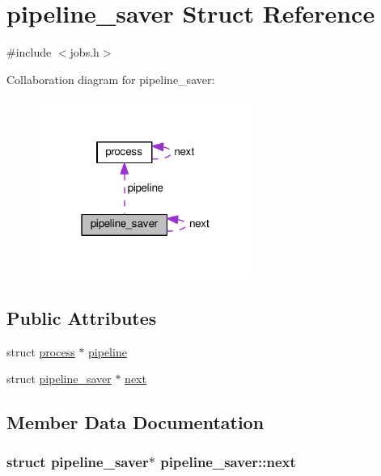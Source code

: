 \hypertarget{structpipeline__saver}{}\section{pipeline\+\_\+saver Struct Reference}
\label{structpipeline__saver}


{\ttfamily \#include $<$jobs.\+h$>$}



Collaboration diagram for pipeline\+\_\+saver\+:
\nopagebreak
\begin{figure}[H]
\begin{center}
\leavevmode
\includegraphics[width=199pt]{structpipeline__saver__coll__graph}
\end{center}
\end{figure}
\subsection*{Public Attributes}
\begin{DoxyCompactItemize}
\item 
struct \hyperlink{structprocess}{process} $\ast$ \hyperlink{structpipeline__saver_a150b4d503a5673894709f96b053de8b2}{pipeline}
\item 
struct \hyperlink{structpipeline__saver}{pipeline\+\_\+saver} $\ast$ \hyperlink{structpipeline__saver_a736199ba9d005768c1a764a5da6a69e6}{next}
\end{DoxyCompactItemize}


\subsection{Member Data Documentation}
\subsubsection[{\texorpdfstring{next}{next}}]{\setlength{\rightskip}{0pt plus 5cm}struct {\bf pipeline\+\_\+saver}$\ast$ pipeline\+\_\+saver\+::next}\hypertarget{structpipeline__saver_a736199ba9d005768c1a764a5da6a69e6}{}\label{structpipeline__saver_a736199ba9d005768c1a764a5da6a69e6}
